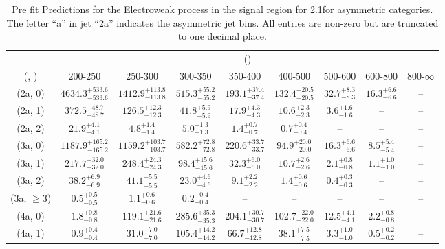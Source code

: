 \begin{table}[h!]
\tiny
\centering
\caption{Pre fit Predictions for the Electroweak process in the signal region for 2.1\ifb for asymmetric categories. The letter ``a'' in jet \eg ``2a''  indicates the asymmetric jet bins. All entries are non-zero but are truncated to one decimal place.\label{tab:predsep_sig_ewk_asym}}
\begin{tabular}
{ccccccccc}
	\hline\hline
	& \multicolumn{8}{c}{\scalht (\gev)} \\ 
	 (\njet,  \nb) & 200-250 & 250-300 & 300-350 & 350-400 & 400-500 & 500-600 & 600-800 & 800-$\infty$ \\ [0.8ex] 
\hline
	(2a, 0) & $4634.3^{+ 533.6 }_{- 533.6 }$ & $1412.9^{+ 113.8 }_{- 113.8 }$ & $515.3^{+ 55.2 }_{- 55.2 }$ & $193.1^{+ 37.4 }_{- 37.4 }$ & $132.4^{+ 20.5 }_{- 20.5 }$ & $32.7^{+ 8.3 }_{- 8.3 }$ & $16.3^{+ 6.6 }_{- 6.6 }$ & -- \\[0.5ex] 
	(2a, 1) & $372.5^{+ 48.7 }_{- 48.7 }$ & $126.5^{+ 12.3 }_{- 12.3 }$ & $41.8^{+ 5.9 }_{- 5.9 }$ & $17.9^{+ 4.3 }_{- 4.3 }$ & $10.6^{+ 2.3 }_{- 2.3 }$ & $3.6^{+ 1.6 }_{- 1.6 }$ & -- & -- \\[0.5ex] 
	(2a, 2) & $21.9^{+ 4.1 }_{- 4.1 }$ & $4.8^{+ 1.4 }_{- 1.4 }$ & $5.0^{+ 1.3 }_{- 1.3 }$ & $1.4^{+ 0.7 }_{- 0.7 }$ & $0.7^{+ 0.4 }_{- 0.4 }$ & -- & -- & -- \\[0.5ex] 
	(3a, 0) & $1187.9^{+ 165.2 }_{- 165.2 }$ & $1159.2^{+ 103.7 }_{- 103.7 }$ & $582.2^{+ 72.8 }_{- 72.8 }$ & $220.6^{+ 33.7 }_{- 33.7 }$ & $94.9^{+ 20.0 }_{- 20.0 }$ & $16.3^{+ 6.6 }_{- 6.6 }$ & $8.5^{+ 5.4 }_{- 5.4 }$ & -- \\[0.5ex] 
	(3a, 1) & $217.7^{+ 32.0 }_{- 32.0 }$ & $248.4^{+ 24.3 }_{- 24.3 }$ & $98.4^{+ 15.6 }_{- 15.6 }$ & $32.3^{+ 6.0 }_{- 6.0 }$ & $10.7^{+ 2.6 }_{- 2.6 }$ & $2.1^{+ 0.8 }_{- 0.8 }$ & $1.1^{+ 1.0 }_{- 1.0 }$ & -- \\[0.5ex] 
	(3a, 2) & $38.2^{+ 6.9 }_{- 6.9 }$ & $41.1^{+ 5.5 }_{- 5.5 }$ & $23.0^{+ 4.6 }_{- 4.6 }$ & $9.1^{+ 2.2 }_{- 2.2 }$ & $1.4^{+ 0.6 }_{- 0.6 }$ & $0.4^{+ 0.3 }_{- 0.3 }$ & -- & -- \\[0.5ex] 
	(3a, $\ge3$) & $0.5^{+ 0.5 }_{- 0.5 }$ & $1.1^{+ 0.6 }_{- 0.6 }$ & $0.2^{+ 0.4 }_{- 0.4 }$ & -- & -- & -- & -- & -- \\[0.5ex] 
	(4a, 0) & $1.8^{+ 0.8 }_{- 0.8 }$ & $119.1^{+ 21.6 }_{- 21.6 }$ & $285.6^{+ 35.3 }_{- 35.3 }$ & $204.1^{+ 30.7 }_{- 30.7 }$ & $102.7^{+ 22.0 }_{- 22.0 }$ & $12.5^{+ 4.1 }_{- 4.1 }$ & $2.2^{+ 0.8 }_{- 0.8 }$ & -- \\[0.5ex] 
	(4a, 1) & $0.9^{+ 0.4 }_{- 0.4 }$ & $31.0^{+ 7.0 }_{- 7.0 }$ & $105.4^{+ 14.2 }_{- 14.2 }$ & $66.7^{+ 12.8 }_{- 12.8 }$ & $38.1^{+ 7.5 }_{- 7.5 }$ & $3.3^{+ 1.0 }_{- 1.0 }$ & $0.5^{+ 0.2 }_{- 0.2 }$ & -- \\[0.5ex] 

\end{tabular}
\end{table}
